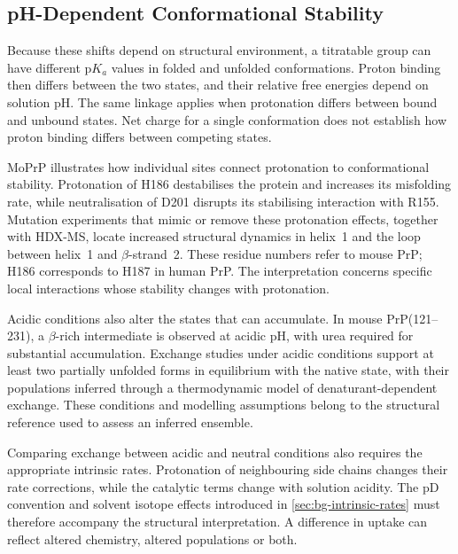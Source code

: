 \subsection{pH-Dependent Conformational Stability}
\label{sec:bg-ph-stability}

Because these shifts depend on structural environment, a titratable group can have different $\mathrm{p}K_a$ values in folded and unfolded conformations. Proton binding then differs between the two states, and their relative free energies depend on solution pH. The same linkage applies when protonation differs between bound and unbound states.\supercite{yangPHDependenceProtein1993,onufrievProtonationPKChanges2013} Net charge for a single conformation does not establish how proton binding differs between competing states.

MoPrP illustrates how individual sites connect protonation to conformational stability. Protonation of H186 destabilises the protein and increases its misfolding rate, while neutralisation of D201 disrupts its stabilising interaction with R155. Mutation experiments that mimic or remove these protonation effects, together with HDX-MS, locate increased structural dynamics in helix~1 and the loop between helix~1 and $\beta$-strand~2.\supercite{singhUnravelingMolecularMechanism2016} These residue numbers refer to mouse PrP; H186 corresponds to H187 in human PrP. The interpretation concerns specific local interactions whose stability changes with protonation.

Acidic conditions also alter the states that can accumulate. In mouse PrP(121--231), a $\beta$-rich intermediate is observed at acidic pH, with urea required for substantial accumulation.\supercite{hornemannScrapielikeUnfoldingIntermediate1998} Exchange studies under acidic conditions support at least two partially unfolded forms in equilibrium with the native state, with their populations inferred through a thermodynamic model of denaturant-dependent exchange.\supercite{moulickPartiallyUnfoldedForms2015} These conditions and modelling assumptions belong to the structural reference used to assess an inferred ensemble.

Comparing exchange between acidic and neutral conditions also requires the appropriate intrinsic rates. Protonation of neighbouring side chains changes their rate corrections, while the catalytic terms change with solution acidity. The pD convention and solvent isotope effects introduced in \cref{sec:bg-intrinsic-rates} must therefore accompany the structural interpretation. A difference in uptake can reflect altered chemistry, altered populations or both.

